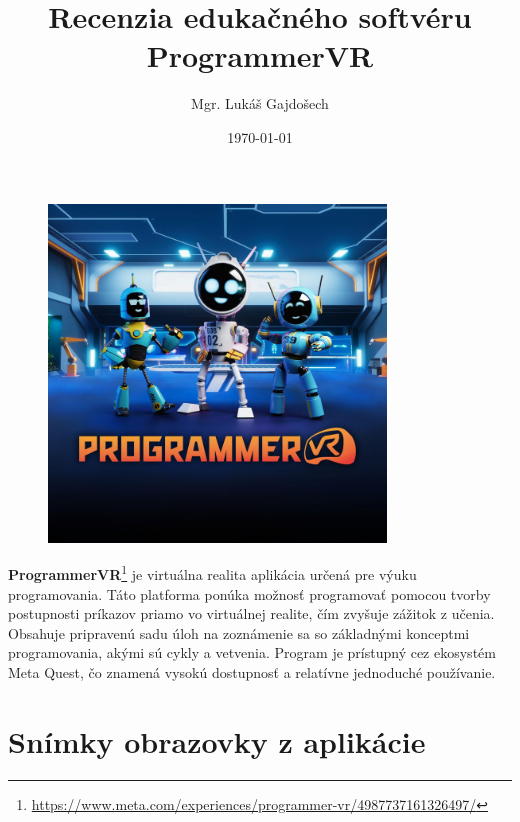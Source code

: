 \documentclass[a4paper,12pt]{article}
\title{Recenzia edukačného softvéru ProgrammerVR}
\author{Mgr. Lukáš Gajdošech}
\date{\today}
\begin{document}
\maketitle

\begin{figure}[H]
    \centering
    \includegraphics[width=0.8\textwidth]{pvr.jpeg}
\end{figure}

\textbf{ProgrammerVR}\footnote{\url{https://www.meta.com/experiences/programmer-vr/4987737161326497/}}
je virtuálna realita aplikácia určená pre výuku programovania.
Táto platforma ponúka možnosť programovať pomocou tvorby postupnosti príkazov priamo vo virtuálnej realite,
čím zvyšuje zážitok z učenia.
Obsahuje pripravenú sadu úloh na zoznámenie sa so základnými konceptmi programovania,
akými sú cykly a vetvenia.
Program je prístupný cez ekosystém Meta Quest,
čo znamená vysokú dostupnosť a relatívne jednoduché používanie.

\newpage

\section*{Snímky obrazovky z aplikácie}
\end{document}
